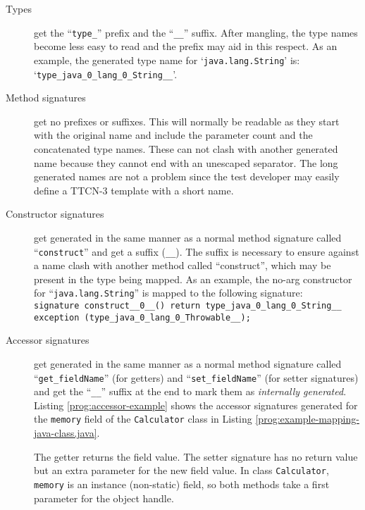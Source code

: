 \begin{description}

\item[Types] get the ``\verb=type_='' prefix and the ``\verb+__+'' suffix.
After mangling, the type names become less easy to read
and the prefix may aid in this respect.
As an example, the generated type name for `\verb=java.lang.String=' is:\\
`\verb=type_java_0_lang_0_String__='.

\item[Method signatures] get no prefixes or suffixes.
This will normally be readable as they start with the original name
and include the parameter count and the concatenated type names.
These can not clash with another generated name because they cannot end
with an unescaped separator.
The long generated names are not a problem since the test developer may easily
define a \ac{TTCN-3} template with a short name.

\item[Constructor signatures] get generated
in the same manner as a normal method signature
called ``\verb=construct='' and get a suffix (\verb+__+).
The suffix is necessary to ensure against a name clash
with another method called ``construct'', which may be present
in the type being mapped.
As an example, the no-arg constructor for ``\verb=java.lang.String=''
is mapped to the following signature:\\
\verb=signature construct__0__() return type_java_0_lang_0_String__=\\
\verb=exception (type_java_0_lang_0_Throwable__);=

\item[Accessor signatures] get generated
in the same manner as a normal method signature called
``\verb=get_fieldName='' (for getters)
and ``\verb=set_fieldName='' (for setter signatures)
and get the ``\verb=__='' suffix at the end to mark them as
\emph{internally generated}.
Listing \ref{prog:accessor-example} shows the accessor signatures
generated for the \verb=memory= field of the \verb=Calculator= class in
Listing \ref{prog:example-mapping-java-class.java}.

\begin{program}
\caption{Example accessor signatures for the \texttt{Calculator.memory} field%
	\label{prog:accessor-example}}
\end{program}

The getter returns the field value.
The setter signature has no return value
but an extra parameter for the new field value.
In class \verb=Calculator=, \verb=memory= is an instance (non-static) field,
so both methods take a first parameter for the object handle.


\end{description}
